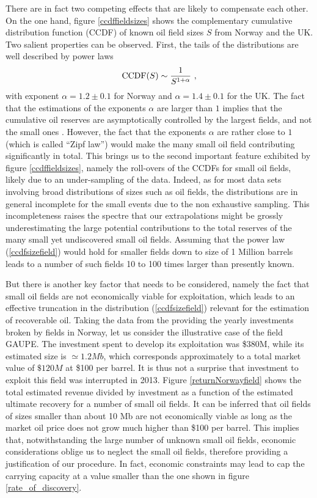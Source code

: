 \documentclass[review]{elsarticle}
\begin{document}
There are in fact two competing effects that are likely to compensate each other.
On the one hand, figure \ref{ccdffieldsizes} shows the complementary 
cumulative distribution function (CCDF) of known oil field sizes $S$ from Norway and the UK.
Two salient properties can be observed. First, the tails 
of the distributions are well described by power laws
\begin{equation}
{\rm CCDF}(S) \sim {1 \over S^{1+\alpha}}~,
\label{ccdfsizefield}
\end{equation}
with exponent $\alpha = 1.2 \pm 0.1$ for Norway and $\alpha = 1.4 \pm 0.1$ for the UK.
The fact that the estimations of the exponents $\alpha$ are larger than $1$ implies
that the cumulative oil reserves are asymptotically controlled by the largest fields, and not the small ones
\citep{Sornette2004}. However, the fact that the exponents $\alpha$ are rather close
to $1$ (which is called ``Zipf law'') would make the many small oil field contributing 
significantly in total. This brings us to the second important feature exhibited by figure \ref{ccdffieldsizes},
namely the roll-overs of the CCDFs for small oil fields, likely due to an under-sampling
of the data. Indeed, as for most data sets involving broad distributions of sizes such
as oil fields, the distributions are in general incomplete for the small events due to the non
exhaustive sampling. This incompleteness raises the spectre that our extrapolations
might be grossly underestimating the large potential contributions to the total reserves
of the many small yet undiscovered small oil fields. Assuming that the power law (\ref{ccdfsizefield})
would hold for smaller fields down to size of 1 Million barrels leads to a number of 
such fields 10 to 100 times larger than presently known. 

But there is another
key factor that needs to be considered, namely the fact that small oil fields
are not economically viable for exploitation, which leads to an effective truncation
in the distribution (\ref{ccdfsizefield}) relevant for the estimation of recoverable oil.
Taking the data from the 
providing the yearly investments broken by fields in Norway, let us consider the illustrative
case of the field GAUPE. The investment spent to 
develop its exploitation was  \$380M, while its estimated size is 
$\simeq 1.2Mb$, which corresponds approximately to a total
market value of $\$120M$ at \$100 per barrel. It is thus not a surprise that
investment to exploit this field was interrupted in 2013. 
Figure \ref{returnNorwayfield} shows the total estimated revenue divided
by investment as a function of the estimated ultimate recovery for a number
of small oil fields. It can be inferred that oil fields of sizes smaller than about 10 Mb
are not economically viable as long as the market oil price does not 
grow much higher than \$100 per barrel. This implies that, notwithstanding
the large number of unknown small oil fields, economic considerations
oblige us to neglect the small oil fields, therefore providing
a justification of our procedure. In fact, economic constraints may lead to 
cap the carrying capacity at a value smaller than 
the one shown in figure  \ref{rate_of_discovery}. 
\end{document}
